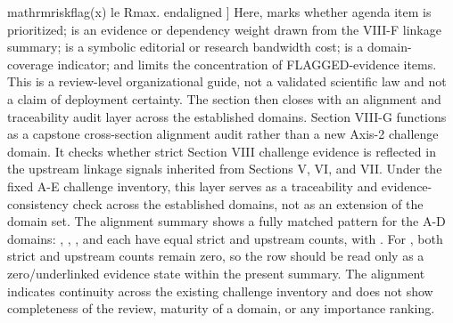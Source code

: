 {}\markdownRendererAmpersand{} \markdownRendererBackslash{}mathrm\markdownRendererLeftBrace{}risk\markdownRendererUnderscore{}flag\markdownRendererRightBrace{}(x) \markdownRendererBackslash{}le R\markdownRendererUnderscore{}\markdownRendererLeftBrace{}\markdownRendererBackslash{}max\markdownRendererRightBrace{}.\markdownRendererSoftLineBreak
{}\markdownRendererBackslash{}end\markdownRendererLeftBrace{}aligned\markdownRendererRightBrace{}\markdownRendererSoftLineBreak
{}]\markdownRendererParagraphSeparator
{}Here,  marks whether agenda item  is prioritized;  is an evidence or dependency weight drawn from the VIII-F linkage summary;  is a symbolic editorial or research bandwidth cost;  is a domain-coverage indicator; and  limits the concentration of FLAGGED-evidence items. This is a review-level organizational guide, not a validated scientific law and not a claim of deployment certainty.\markdownRendererParagraphSeparator
{}The section then closes with an alignment and traceability audit layer across the established domains.\markdownRendererInterblockSeparator
{}
\markdownRendererSectionEnd 
\markdownRendererSectionEnd \markdownRendererSectionBegin
{}\markdownRendererInterblockSeparator
{}Section VIII-G functions as a capstone cross-section alignment audit rather than a new Axis-2 challenge domain. It checks whether strict Section VIII challenge evidence is reflected in the upstream linkage signals inherited from Sections V, VI, and VII. Under the fixed A-E challenge inventory, this layer serves as a traceability and evidence-consistency check across the established domains, not as an extension of the domain set.\markdownRendererParagraphSeparator
{}The alignment summary shows a fully matched pattern for the A-D domains: , , , and  each have equal strict and upstream counts, with . For , both strict and upstream counts remain zero, so the row should be read only as a zero/underlinked evidence state within the present summary. The alignment indicates continuity across the existing challenge inventory and does not show completeness of the review, maturity of a domain, or any importance ranking.\markdownRendererParagraphSeparator
